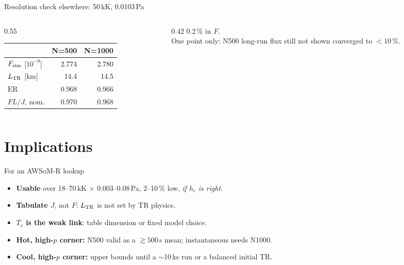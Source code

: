 \documentclass[aspectratio=169,10pt]{beamer}
\newcommand{\LTR}{L_{\rm TR}}
\newcommand{\Fsim}{F_{\rm sim}}
\newcommand{\ER}{\mathrm{ER}}
\begin{document}
\begin{frame}{Resolution check elsewhere: 50\,kK, 0.0103\,Pa}
  \vfill
  \begin{columns}[c]
    \begin{column}{0.55\textwidth}
      \begin{tabular}{@{}lrr@{}}
        \toprule
        & N=500 & N=1000 \\
        \midrule
        $\Fsim$ [$10^{-9}$] & 2.774 & 2.780 \\
        $\LTR$ [km] & 14.4 & 14.5 \\
        $\ER$ & 0.968 & 0.966 \\
        $F L/J$, nom. & 0.970 & 0.968 \\
        \bottomrule
      \end{tabular}
    \end{column}
    \begin{column}{0.42\textwidth}
      \small
      0.2\,\% in $F$.\\[6pt]
      One point only: N500 long-run flux still not shown converged to
      $<10\,\%$.
    \end{column}
  \end{columns}
  \vfill
\end{frame}

\section{Implications}

\begin{frame}{For an AWSoM-R lookup}
  \begin{itemize}\itemsep10pt
    \item \textbf{Usable} over 18--70\,kK $\times$ 0.003--0.08\,Pa, 2--10\,\%
          low, \emph{if $h_c$ is right}.
    \item \textbf{Tabulate $J$}, not $F$: $\LTR$ is not set by TR physics.
    \item \textbf{$T_c$ is the weak link}: table dimension or fixed model
          choice.
    \item \textbf{Hot, high-$p$ corner:} N500 valid as a $\gtrsim 500$\,s
          mean; instantaneous needs N1000.
    \item \textbf{Cool, high-$p$ corner:} upper bounds until a $\sim$10\,ks run
          or a balanced initial TR.
  \end{itemize}
\end{frame}
\end{document}
